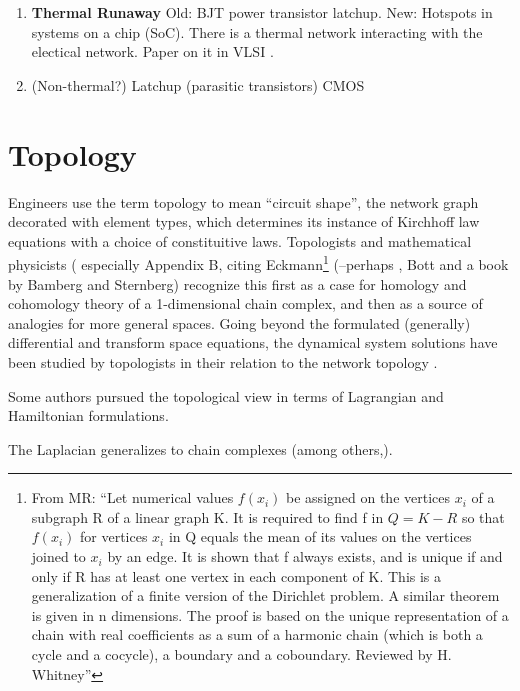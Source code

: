 \documentclass{article}
\begin{document}
\begin{enumerate}
\item
\textbf{Thermal Runaway} Old: BJT power transistor latchup.  New: Hotspots 
in systems on a chip (SoC). There is a thermal network interacting with the 
electical network. Paper on it in VLSI \cite{ThermalVLSI}.

\item (Non-thermal?) Latchup (parasitic transistors) 
CMOS\cite{CMOSLatchUpTINote}

\end{enumerate}

\section{Topology}

Engineers use the term topology to  mean ``circuit shape'', 
the network graph decorated with element types, which determines
its instance of Kirchhoff law equations with a choice of constituitive laws.
Topologists and mathematical physicists (\cite{Frankel} especially Appendix
B, citing 
Eckmann\footnote{
From MR: ``Let numerical values $f(x_i)$ be assigned on the vertices
$x_i$ of a subgraph R of a linear graph K. It is required to find f in
$Q=K−R$ so that $f(x_i)$ for vertices $x_i$ in Q equals the mean of
its values on the vertices joined to $x_i$ by an edge. It is shown
that f always exists, and is unique if and only if R has at least one
vertex in each component of K. This is a generalization of a finite
version of the Dirichlet problem. A similar theorem is given in n
dimensions. The proof is based on the unique representation of a chain
with real coefficients as a sum of a harmonic chain (which is both a
cycle and a cocycle), a boundary and a coboundary.  Reviewed by
H. Whitney''}
(\cite{Eckmann}--perhaps \cite{EckmannWorks}, 
Bott\cite{BottInducedRep} and a book by Bamberg and 
Sternberg\cite{BambergSternbergBookII})
recognize this first as a case for homology and cohomology theory of a 
1-dimensional chain complex, and then as a source of analogies for more 
general spaces.  Going beyond the formulated (generally) differential 
and transform space equations, the dynamical system solutions have been
studied by topologists in their relation to the network topology
\cite{MathFoundElecSmale}.
   
Some authors pursued the topological view in terms of 
Lagrangian and Hamiltonian formulations\cite{ChuaMcPhersonLagrange}.

The Laplacian generalizes to chain complexes 
(among others,\cite{Frankel,DuvalKlivansMartin}).
\end{document}
